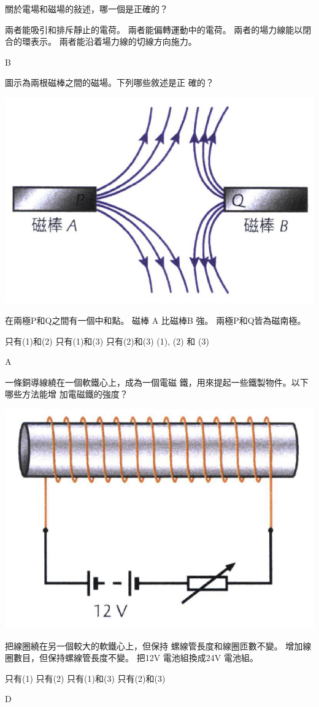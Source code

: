 {
    關於電場和磁場的敍述，哪一個是正確的？
    \begin{tasks}
        \task 兩者能吸引和排斥靜止的電荷。
        \task 兩者能偏轉運動中的電荷。
        \task 兩者的場力線能以閉合的環表示。
        \task 兩者能沿着場力線的切線方向施力。
    \end{tasks}
}{B}

{
    圖示為兩根磁棒之間的磁場。下列哪些敘述是正 確的？
    \par{\par\centering\includegraphics[width=.35\textwidth]{./img/ch4_magnetostatics_mc_2024-06-23-20-56-53.png}\par}
    \begin{statements}
        \task 在兩極P和Q之間有一個中和點。
        \task 磁棒 A 比磁棒B 強。
        \task 兩極P和Q皆為磁南極。
    \end{statements}
    \begin{tasks}
        \task 只有(1)和(2)
        \task 只有(1)和(3)
        \task 只有(2)和(3)
        \task (1), (2) 和 (3)
    \end{tasks}
}{A}

{
    一條銅導線繞在一個軟鐵心上，成為一個電磁 鐵，用來提起一些鐵製物件。以下哪些方法能增 加電磁鐵的強度？
    \par{\par\centering\includegraphics[width=.35\textwidth]{./img/ch4_magnetostatics_mc_2024-06-23-20-59-43.png}\par}

    \begin{statements}
        \task 把線圈繞在另一個較大的軟鐵心上，但保持 螺線管長度和線圈匝數不變。
        \task 增加線圈數目，但保持螺線管長度不變。
        \task 把12V 電池組換成24V 電池組。
    \end{statements}
    \begin{tasks}
        \task 只有(1)
        \task 只有(2)
        \task 只有(1)和(3)
        \task 只有(2)和(3)
    \end{tasks}
}{D}

